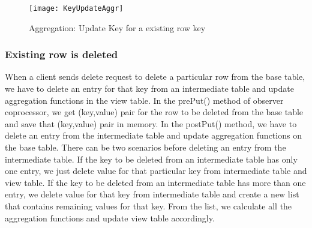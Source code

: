 \documentclass[11pt,a4paper,bibtotoc,idxtotoc,headsepline,footsepline,footexclude,BCOR12mm,DIV13]{scrbook}
\begin{document}

\begin{figure}
    \centering
    \texttt{[image: KeyUpdateAggr]}
    \caption{Aggregation: Update Key for a existing row key}
    \label{sec:updateKeyforexistingrow}
    
\end{figure} 

\newpage
\subsubsection{Existing row is deleted}
\label{subsubsec:rowdelete}
When a client sends delete request to delete a particular row from the base table, we have to delete an entry for that key from an intermediate table and update aggregation functions in the view table. In the prePut() method of observer coprocessor, we get (key,value) pair for the row to be deleted from the base table and save that (key,value) pair in memory. In the postPut() method, we have to delete an entry from the intermediate table and update aggregation functions on the base table. There can be two scenarios before deleting an entry from the intermediate table. If the key to be deleted from an intermediate table has only one entry, we just delete value for that particular key from intermediate table and view table. If the key to be deleted from an intermediate table has more than one entry, we delete value for that key from intermediate table and create a new list that contains remaining values for that key. From the list, we calculate all the aggregation functions and update view table accordingly.
\end{document}
